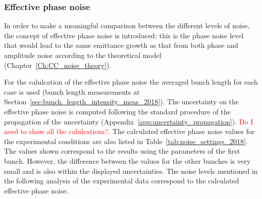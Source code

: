 \subsubsection*{Effective phase noise}
In order to make a meaningful comparison between the different levels of noise, the concept of effective phase noise is introduced: this is the phase noise level that would lead to the same emittance growth as that from both phase and amplitude noise according to the theoretical model (Chapter~\ref{Ch:CC_noise_theory}). 

For the calulcation of the effective phase noise the averaged bunch length for each case is used (bunch length measurements at Section~\ref{sec:bunch_length_intensity_meas_2018}). The uncertainty on the effective phase noise is computed following the standard procedure of the propagation of the uncertainty (Appendix~\ref{app:uncertainty_propagation}). \textcolor{red}{Do I need to show all the calulcations?.} The calculated effective phase noise values for the experimental conditions are also listed in Table~\ref{tab:noise_settings_2018}. The values shown correspond to the results using the parameters of the first bunch. However, the difference between the values for the other bunches is very small and is also within the displayed uncertainties. The noise levels mentioned in the following analysis of the experimental data correspond to the calculated effective phase noise. 

